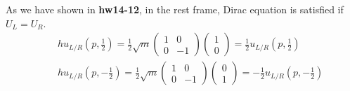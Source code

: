 \documentclass[11pt]{article}
\begin{document}
\section{ }
As we have shown in {\bf hw14-12}, in the rest frame, Dirac equation is satisfied if $U_L=U_R$.
\begin{eqnarray}
   && hu_{L/R}(p,\frac{1}{2})=\frac{1}{2}\sqrt{m}
    \begin{pmatrix}
        1 & 0 \\
        0 & -1
    \end{pmatrix}
    \begin{pmatrix}
        1 \\ 0
    \end{pmatrix}
    = \frac{1}{2} u_{L/R}(p,\frac{1}{2}) \\ 
    && hu_{L/R}(p,-\frac{1}{2})=\frac{1}{2}\sqrt{m}
    \begin{pmatrix}
        1 & 0 \\
        0 & -1
    \end{pmatrix}
    \begin{pmatrix}
        0 \\ 1
    \end{pmatrix}
    = -\frac{1}{2} u_{L/R}(p,-\frac{1}{2})
\end{eqnarray}
\end{document}
